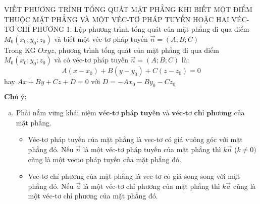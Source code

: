 \begin{dang}{VIẾT PHƯƠNG TRÌNH TỔNG QUÁT MẶT PHẲNG KHI BIẾT MỘT ĐIỂM THUỘC MẶT PHẲNG VÀ MỘT VÉC-TƠ PHÁP TUYẾN HOẶC HAI VÉC-TƠ CHỈ PHƯƠNG}
1. Lập phương trình tổng quát của mặt phẳng đi qua điểm $M_0 \left(x_0;y_0;z_0\right)$ và biết một véc-tơ pháp tuyến $\overrightarrow{n} = \left(A;B;C\right)$\\
Trong KG $Oxyz$, phương trình tổng quát của mặt phẳng đi qua điểm $M_0 \left(x_0;y_0;z_0\right)$ và có véc-tơ pháp tuyến $\overrightarrow{n}= \left(A;B;C\right)$ là:\\
$$A\left(x-x_0\right) + B\left(y-y_0\right)+C\left(z-z_0\right) = 0$$
hay $Ax+By+Cz+D=0$ với $D= -Ax_0-By_0-Cz_0$
\begin{center}
\end{center}
$\textbf{Chú ý:}$
\begin{enumerate}[a.]
\item Phải nắm vững khái niệm $\textbf{véc-tơ pháp tuyến}$ và $\textbf{véc-tơ chỉ phương}$ của mặt phẳng.
\begin{itemize}
\item Véc-tơ pháp tuyến của mặt phẳng là vec-tơ có giá vuông góc với mặt phẳng đó. Nếu $\overrightarrow{n}$ là một véc-tơ pháp tuyến của mặt phẳng thì $k\overrightarrow{n}$ ($k \neq 0)$ cũng là một vectơ pháp tuyến của mặt phẳng đó.
\item Vec-tơ chỉ phương của mặt phẳng là vec-tơ có giá song song với mặt phẳng đó. Nếu $\overrightarrow{a}$ là một véc-tơ chỉ phương của mặt phẳng thì $k\overrightarrow{a}$ cũng là một véc-tơ chỉ phương của mặt phẳng đó.
\end{itemize}

\end{enumerate}
\end{dang}
